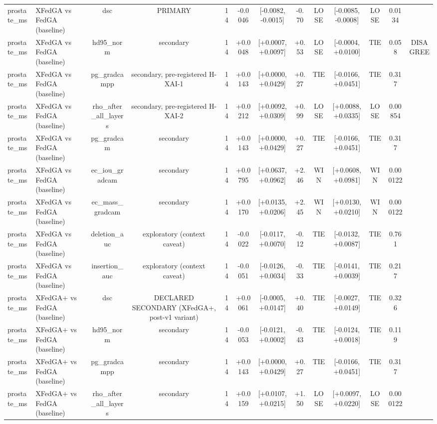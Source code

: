 \begin{tabular}{llccccccccccc}
prostate\_ms & XFedGA vs FedGA (baseline) & dsc & PRIMARY & 14 & -0.0046 & [-0.0082, -0.0015] & -0.70 & LOSE & [-0.0085, -0.0008] & LOSE & 0.0134 &  \\
prostate\_ms & XFedGA vs FedGA (baseline) & hd95\_norm & secondary & 14 & +0.0048 & [+0.0007, +0.0097] & +0.53 & LOSE & [-0.0004, +0.0100] & TIE & 0.058 & DISAGREE \\
prostate\_ms & XFedGA vs FedGA (baseline) & pg\_gradcampp & secondary, pre-registered H-XAI-1 & 14 & +0.0143 & [+0.0000, +0.0429] & +0.27 & TIE & [-0.0166, +0.0451] & TIE & 0.317 &  \\
prostate\_ms & XFedGA vs FedGA (baseline) & rho\_after\_all\_layers & secondary, pre-registered H-XAI-2 & 14 & +0.0212 & [+0.0092, +0.0309] & +0.99 & LOSE & [+0.0088, +0.0335] & LOSE & 0.00854 &  \\
prostate\_ms & XFedGA vs FedGA (baseline) & pg\_gradcam & secondary & 14 & +0.0143 & [+0.0000, +0.0429] & +0.27 & TIE & [-0.0166, +0.0451] & TIE & 0.317 &  \\
prostate\_ms & XFedGA vs FedGA (baseline) & ec\_iou\_gradcam & secondary & 14 & +0.0795 & [+0.0637, +0.0962] & +2.46 & WIN & [+0.0608, +0.0981] & WIN & 0.000122 &  \\
prostate\_ms & XFedGA vs FedGA (baseline) & ec\_mass\_gradcam & secondary & 14 & +0.0170 & [+0.0135, +0.0206] & +2.45 & WIN & [+0.0130, +0.0210] & WIN & 0.000122 &  \\
prostate\_ms & XFedGA vs FedGA (baseline) & deletion\_auc & exploratory (context caveat) & 14 & -0.0022 & [-0.0117, +0.0070] & -0.12 & TIE & [-0.0132, +0.0087] & TIE & 0.761 &  \\
prostate\_ms & XFedGA vs FedGA (baseline) & insertion\_auc & exploratory (context caveat) & 14 & -0.0051 & [-0.0126, +0.0034] & -0.33 & TIE & [-0.0141, +0.0039] & TIE & 0.217 &  \\
prostate\_ms & XFedGA+ vs FedGA (baseline) & dsc & DECLARED SECONDARY (XFedGA+, post-v1 variant) & 14 & +0.0061 & [-0.0005, +0.0147] & +0.40 & TIE & [-0.0027, +0.0149] & TIE & 0.326 &  \\
prostate\_ms & XFedGA+ vs FedGA (baseline) & hd95\_norm & secondary & 14 & -0.0053 & [-0.0121, +0.0002] & -0.43 & TIE & [-0.0124, +0.0018] & TIE & 0.119 &  \\
prostate\_ms & XFedGA+ vs FedGA (baseline) & pg\_gradcampp & secondary & 14 & +0.0143 & [+0.0000, +0.0429] & +0.27 & TIE & [-0.0166, +0.0451] & TIE & 0.317 &  \\
prostate\_ms & XFedGA+ vs FedGA (baseline) & rho\_after\_all\_layers & secondary & 14 & +0.0159 & [+0.0107, +0.0215] & +1.50 & LOSE & [+0.0097, +0.0220] & LOSE & 0.000122 &  \\

\end{tabular}
